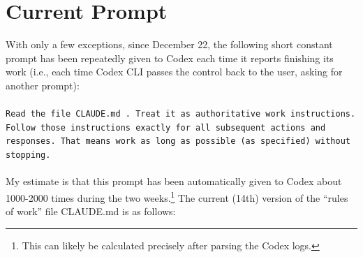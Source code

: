 \documentclass[a4paper,UKenglish,cleveref, autoref, thm-restate]{lipics-v2021}
\begin{document}
\section{Current Prompt}

%
%
%


%

%

%



With only a few exceptions, since December 22, the following short constant prompt has been repeatedly given to Codex each time it reports finishing its work (i.e., each time Codex CLI passes the control back to the user, asking for another prompt):\\\\
\texttt{Read the file CLAUDE.md . Treat it as authoritative work instructions. Follow those instructions exactly for all
  subsequent actions and responses. That means work as long as possible (as specified) without stopping.}\\
\\
My estimate is that this prompt has been automatically given to Codex about 1000-2000 times during the two weeks.\footnote{This can likely be calculated precisely after parsing the Codex logs.}
The current (14th) version of the ``rules of work'' file CLAUDE.md is as follows:
\end{document}
